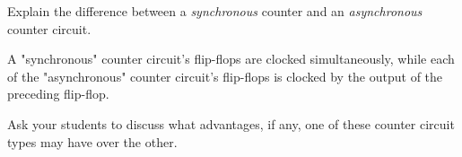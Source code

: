 

Explain the difference between a {\it synchronous} counter and an {\it asynchronous} counter circuit.







A "synchronous" counter circuit's flip-flops are clocked simultaneously, while each of the "asynchronous" counter circuit's flip-flops is clocked by the output of the preceding flip-flop.







Ask your students to discuss what advantages, if any, one of these counter circuit types may have over the other.




